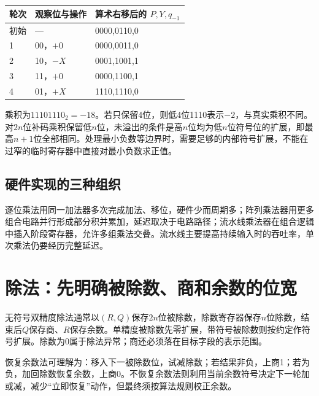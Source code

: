 \par\medskip\noindent\begin{minipage}{\linewidth}\fontsize{9.3}{12}\selectfont\begin{tabularx}{\linewidth}{@{}YYY@{}}
\toprule\noalign{}
轮次 & 观察位与操作 & 算术右移后的 \(P,Y,q_{-1}\) \\
\midrule\noalign{}


初始 & --- & 0000,0110,0 \\
1 & 00，\(+0\) & 0000,0011,0 \\
2 & 10，\(-X\) & 0001,1001,1 \\
3 & 11，\(+0\) & 0000,1100,1 \\
4 & 01，\(+X\) & 1110,1110,0 \\
\bottomrule\end{tabularx}
\end{minipage}\par\medskip

乘积为\(11101110_2=-18\)。若只保留4位，则低4位1110表示\(-2\)，与真实乘积不同。对\(2n\)位补码乘积保留低\(n\)位，未溢出的条件是高\(n\)位均为低\(n\)位符号位的扩展，即最高\(n+1\)位全部相同。处理最小负数等边界时，需要足够的内部符号扩展，不能在过窄的临时寄存器中直接对最小负数求正值。

\subsection{硬件实现的三种组织}\label{CO02-multiply-hardware}

逐位乘法用同一加法器多次完成加法、移位，硬件少而周期多；阵列乘法器用更多组合电路并行形成部分积并累加，延迟取决于电路路径；流水线乘法器在组合逻辑中插入阶段寄存器，允许多组乘法交叠。流水线主要提高持续输入时的吞吐率，单次乘法仍要经历完整延迟。

\section{除法：先明确被除数、商和余数的位宽}\label{CO02-division-complete}

无符号双精度除法通常以\((R,Q)\)保存\(2n\)位被除数，除数寄存器保存\(n\)位除数，结束后\(Q\)保存商、\(R\)保存余数。单精度被除数先零扩展，带符号被除数则按约定作符号扩展。除数为0属于除法异常；商还必须落在目标字段的表示范围。

恢复余数法可理解为：移入下一被除数位，试减除数；若结果非负，上商1；若为负，加回除数恢复余数，上商0。不恢复余数法则利用当前余数符号决定下一轮加或减，减少``立即恢复''动作，但最终须按算法规则校正余数。

